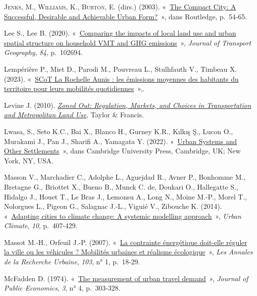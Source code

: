 \documentclass[
  9pt,
  a4paper,
  DIV=11]{scrreprt}
\newlength{\cslhangindent}
\newenvironment{CSLReferences}[2] %
 {\begin{list}{}{%
  \setlength{\itemindent}{0pt}
  \setlength{\leftmargin}{0pt}
  \setlength{\parsep}{0pt}
  \ifodd #1
   \setlength{\leftmargin}{\cslhangindent}
   \setlength{\itemindent}{-1\cslhangindent}
  \fi
  \setlength{\itemsep}{#2\baselineskip}}}
 {\end{list}}
\begin{document}
\begin{CSLReferences}{0}{1}
\textsc{Jenks, M.}, \textsc{Williams, K.}, \textsc{Burton, E.} (dirs.)
(2003). {«~\href{https://doi.org/10.4324/9780203362372-12}{The Compact
City: A Successful, Desirable and Achievable Urban Form?}~»}, dans
Routledge, p.~54‑65.

Lee S., Lee B. (2020).
{«~\href{https://doi.org/10.1016/j.jtrangeo.2020.102694}{Comparing the
impacts of local land use and urban spatial structure on household VMT
and GHG emissions}~»}, \emph{Journal of Transport Geography}, \emph{84},
p.~102694.

Lempérière P., Miet D., Parodi M., Pouvreau L., Stulhfauth V., Timbeau
X. (2023).
{«~\href{https://publications.vv.energy/la-rochelle-aunis-carbone.html}{SCoT
La Rochelle Aunis : les émissions moyennes des habitants du territoire
pour leurs mobilités quotidiennes}~»},.

Levine J. (2010).
\emph{\href{https://books.google.fr/books?id=HTCl9W9rg3oC}{Zoned Out:
Regulation, Markets, and Choices in Transportation and Metropolitan Land
Use}}, Taylor \& Francis.

Lwasa, S., Seto K.C., Bai X., Blanco H., Gurney K.R., Kılkış Ş., Lucon
O., Murakami J., Pan J., Sharifi A., Yamagata Y. (2022).
{«~\href{https://www.ipcc.ch/report/ar6/wg3/downloads/report/IPCC_AR6_WGIII_Chapter08.pdf}{Urban
Systems and Other Settlements}~»}, dans Cambridge University Press,
Cambridge, UK; New York, NY, USA.

Masson V., Marchadier C., Adolphe L., Aguejdad R., Avner P., Bonhomme
M., Bretagne G., Briottet X., Bueno B., Munck C. de, Doukari O.,
Hallegatte S., Hidalgo J., Houet T., Le Bras J., Lemonsu A., Long N.,
Moine M.-P., Morel T., Nolorgues L., Pigeon G., Salagnac J.-L., Viguié
V., Zibouche K. (2014).
{«~\href{https://doi.org/10.1016/j.uclim.2014.03.004}{Adapting cities to
climate change: A systemic modelling approach}~»}, \emph{Urban Climate},
\emph{10}, p.~407‑429.

Massot M.-H., Orfeuil J.-P. (2007).
{«~\href{https://doi.org/10.3406/aru.2007.2710}{La contrainte
énergétique doit-elle réguler la ville ou les véhicules ? Mobilités
urbaines et réalisme écologique}~»}, \emph{Les Annales de la Recherche
Urbaine}, \emph{103}, n° 1, p.~18‑29.

McFadden D. (1974).
{«~\href{https://doi.org/10.1016/0047-2727(74)90003-6}{The measurement
of urban travel demand}~»}, \emph{Journal of Public Economics},
\emph{3}, n° 4, p.~303‑328.


\end{CSLReferences}
\end{document}
